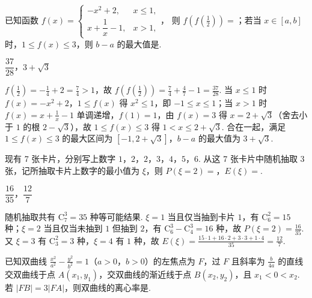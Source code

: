 \begin{problem}
已知函数
\(f(x)=\begin{cases}
-x^2+2,&x\le 1,\\
x+\dfrac{1}{x}-1,&x>1,
\end{cases}\)，
则 \(f\left(f\left(\frac12\right)\right)=\)\fillinblank{}；若当 \(x\in[a,b]\) 时，\(1\le f(x)\le 3\)，则 \(b-a\) 的最大值是\fillinblank{}.
\end{problem}

\begin{answer}
\(\dfrac{37}{28}\)，\(3+\sqrt3\)
\end{answer}

\begin{solution}
\(f\left(\frac12\right)=-\frac14+2=\frac74>1\)，故 \(f\left(f\left(\frac12\right)\right)=\frac74+\frac47-1=\frac{37}{28}\). 当 \(x\le1\) 时 \(f(x)=-x^2+2\)，\(1\le f(x)\) 得 \(x^2\le1\)，即 \(-1\le x\le1\)；当 \(x>1\) 时 \(f(x)=x+\frac1x-1\) 单调递增，\(f(1)=1\)，由 \(f(x)=3\) 得 \(x=2+\sqrt3\)（舍去小于 \(1\) 的根 \(2-\sqrt3\)），故 \(1\le f(x)\le3\) 得 \(1<x\le2+\sqrt3\). 合在一起，满足 \(1\le f(x)\le3\) 的最大区间为 \([-1,2+\sqrt3]\)，\(b-a\) 的最大值为 \(3+\sqrt3\).
\end{solution}

\begin{problem}
现有 7 张卡片，分别写上数字 \(1\)，\(2\)，\(2\)，\(3\)，\(4\)，\(5\)，\(6\). 从这 7 张卡片中随机抽取 3 张，记所抽取卡片上数字的最小值为 \(\xi\)，则 \(P(\xi=2)=\)\fillinblank{}，\(E(\xi)=\)\fillinblank{}.
\end{problem}

\begin{answer}
\(\dfrac{16}{35}\)，\(\dfrac{12}{7}\)
\end{answer}

\begin{solution}
随机抽取共有 \(\mathrm C_7^3=35\) 种等可能结果. \(\xi=1\) 当且仅当抽到卡片 \(1\)，有 \(\mathrm C_6^2=15\) 种；\(\xi=2\) 当且仅当未抽到 \(1\) 但抽到 \(2\)，有 \(\mathrm C_6^3-\mathrm C_4^3=16\) 种，故 \(P(\xi=2)=\frac{16}{35}\). 又 \(\xi=3\) 有 \(\mathrm C_3^2=3\) 种，\(\xi=4\) 有 \(1\) 种，故 \(E(\xi)=\frac{15\cdot1+16\cdot2+3\cdot3+1\cdot4}{35}=\frac{12}7\).
\end{solution}

\begin{problem}
已知双曲线 \(\frac{x^2}{a^2}-\frac{y^2}{b^2}=1\)（\(a>0\)，\(b>0\)）的左焦点为 \(F\)，过 \(F\) 且斜率为 \(\frac{b}{4a}\) 的直线交双曲线于点 \(A(x_1,y_1)\)，交双曲线的渐近线于点 \(B(x_2,y_2)\)，且 \(x_1<0<x_2\). 若 \(|FB|=3|FA|\)，则双曲线的离心率是\fillinblank{}.
\end{problem}

